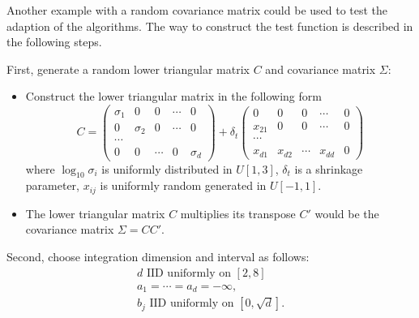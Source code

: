 \documentclass{iitthesis}
\theoremstyle{definition}
\begin{document}
Another example with a random covariance matrix could be used to test the adaption of the algorithms. The way to construct the test function is described in the following steps. 

First, generate a random lower triangular matrix $C$ and covariance matrix $\Sigma$:
\begin{itemize}
\item Construct the lower triangular matrix in the following form
\begin{equation}\label{lowertrimatrixC}
C = \left (\begin{array}{ccccc}
\sigma_1&0&0&\cdots&0\\
0&\sigma_2&0& \cdots &0 \\
\cdots\\
0&0&\cdots&0&\sigma_d \end{array}\right)+\delta_t  \left (\begin{array}{ccccc}
0&0&0&\cdots&0\\
x_{21}&0&0& \cdots &0 \\
\cdots\\
x_{d1}&x_{d2}&\cdots&x_{dd}&0 \end{array}\right)
\end{equation}
where $\log_{10}\sigma_i$ is uniformly distributed in $U[1,3]$, $\delta_t$ is a shrinkage parameter, $x_{ij}$ is uniformly random generated in $U[-1,1]$.
\item The lower triangular matrix $C$ multiplies its transpose $C'$ would be the covariance matrix $\Sigma = CC'$.
\end{itemize}
Second, choose integration dimension and interval as follows:
\begin{subequations} \label{MVNPexp2param}
\begin{gather}
d \text{ IID uniformly on } [2,8] \\
a_1=\cdots=a_d =-\infty,\\
b_j \text{ IID uniformly on } [0,\sqrt{d}].
\end{gather}
\end{subequations}
\end{document}
